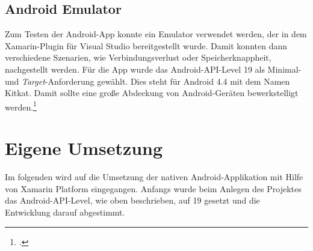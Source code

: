 \subsection{Android Emulator}
\label{ssec:xamarin-emulator}
Zum Testen der Android-App konnte ein Emulator verwendet werden, der in dem Xamarin-Plugin für Visual Studio bereitgestellt wurde. Damit konnten dann verschiedene Szenarien, wie Verbindungsverlust oder Speicherknappheit, nachgestellt werden. Für die App wurde das Android-API-Level 19 als Minimal- und \textit{Target}-Anforderung gewählt. Dies steht für Android 4.4 mit dem Namen Kitkat. Damit sollte eine große Abdeckung von Android-Geräten bewerkstelligt werden.\footcite{Xamarin-API}
\section{Eigene Umsetzung}
\label{sec:nat-umsetzung}
Im folgenden wird auf die Umsetzung der nativen Android-Applikation mit Hilfe von Xamarin Platform eingegangen. Anfangs wurde beim Anlegen des Projektes das Android-API-Level, wie oben beschrieben, auf 19 gesetzt und die Entwicklung darauf abgestimmt.

